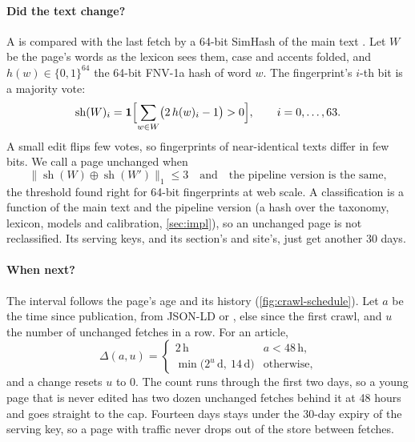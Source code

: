 \paragraph{Did the text change?} A  is compared with the last fetch by a 64-bit SimHash of the main text \citep{charikar2002similarity}. Let $W$ be the page's words as the lexicon sees them, case and accents folded, and $h(w) \in \{0,1\}^{64}$ the 64-bit FNV-1a hash of word $w$. The fingerprint's $i$-th bit is a majority vote:
\begin{equation}\label{eq:crawl-simhash}
  \operatorname{sh}(W)_i = \mathbf{1}\Bigl[\sum_{w \in W} \bigl(2\,h(w)_i - 1\bigr) > 0\Bigr], \qquad i = 0, \dots, 63.
\end{equation}
A small edit flips few votes, so fingerprints of near-identical texts differ in few bits. We call a page unchanged when
\begin{equation}\label{eq:crawl-unchanged}
  \bigl\lVert \operatorname{sh}(W) \oplus \operatorname{sh}(W') \bigr\rVert_1 \le 3
  \quad\text{and}\quad
  \text{the pipeline version is the same},
\end{equation}
the threshold \citet{manku2007detecting} found right for 64-bit fingerprints at web scale. A classification is a function of the main text and the pipeline version (a hash over the taxonomy, lexicon, models and calibration, \cref{sec:impl}), so an unchanged page is not reclassified. Its serving keys, and its section's and site's, just get another 30 days.

\paragraph{When next?} The interval follows the page's age and its history (\cref{fig:crawl-schedule}). Let $a$ be the time since publication, from JSON-LD  or , else since the first crawl, and $u$ the number of unchanged fetches in a row. For an article,
\begin{equation}\label{eq:crawl-interval}
  \Delta(a, u) =
  \begin{cases}
    2\,\mathrm{h} & a < 48\,\mathrm{h},\\
    \min\bigl(2^{u}\,\mathrm{d},\ 14\,\mathrm{d}\bigr) & \text{otherwise,}
  \end{cases}
\end{equation}
and a change resets $u$ to 0. The count runs through the first two days, so a young page that is never edited has two dozen unchanged fetches behind it at 48 hours and goes straight to the cap. Fourteen days stays under the 30-day expiry of the serving key, so a page with traffic never drops out of the store between fetches.

